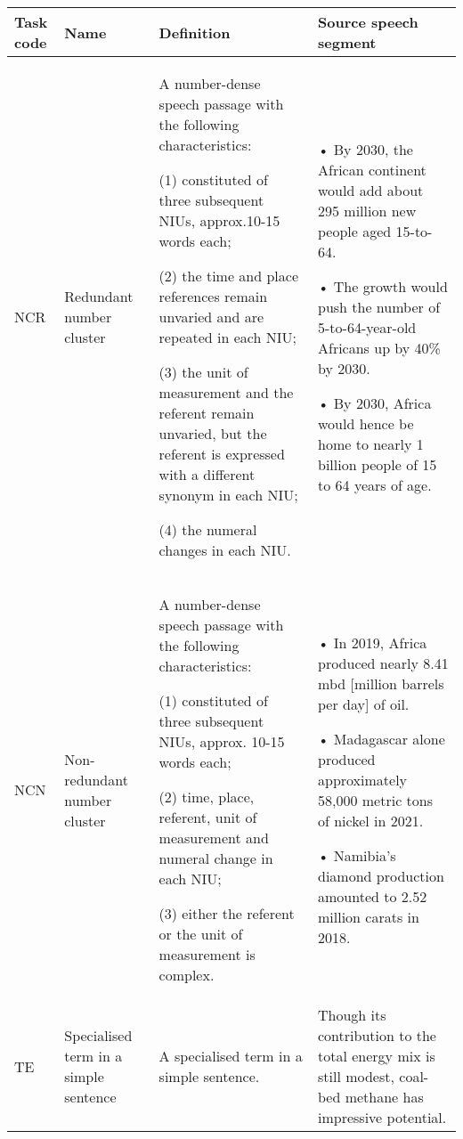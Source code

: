 \begin{sidewaystable}
\small
\begin{tabularx}{\textwidth}{l>{\raggedright\arraybackslash}p{}QQ}
\midrule
{Task code} & {Name}    & {Definition}   & {Source speech segment}       \\ \midrule
NCR                & Redundant number cluster                                            & A number-dense speech passage with the following characteristics: 

(1) constituted of three subsequent NIUs, approx.10-15 words each; 

(2) the time and place references remain unvaried and are repeated in each   NIU;

(3) the unit of measurement and the referent remain unvaried, but the referent is expressed with a different synonym in each NIU;

(4) the numeral changes in each NIU. & • By 2030, the African continent would add about 295 million new people aged 15-to-64.

• The growth would push the number of  5-to-64-year-old Africans up by 40\% by 2030. 

• By 2030, Africa would hence be home to nearly 1 billion people of 15 to 64 years of age. \\
\tablevspace
NCN                & Non-redundant number cluster                                        & A number-dense speech passage with the following characteristics:    

(1) constituted of three subsequent NIUs, approx. 10-15 words each;     

(2) time, place, referent, unit of measurement and numeral change in each   NIU; 

(3) either the referent or the unit of measurement is complex.                                                                                                    & • In 2019, Africa produced nearly 8.41 mbd {[}million barrels per day{]} of oil. 

• Madagascar alone produced approximately 58,000 metric tons of nickel in 2021. 

• Namibia's diamond production amounted to 2.52 million carats in 2018.                                \\
\tablevspace
TE                 & Specialised term in a simple sentence                                & A specialised term in a simple sentence.                                                                                                                                                                                                                                                                                                                                                                                                                    & Though its contribution to the total energy mix is still modest, coal-bed methane has impressive potential.                                                                                                                                                                     \\
\midrule
\end{tabularx}
\end{sidewaystable}

